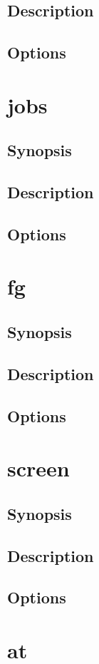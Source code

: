 \documentclass[a4paper, 10pt, onecolumn, openright, oneside]{book}
\begin{document}
			\subsection{Description}
			\subsection{Options}
		\section{jobs}
			\subsection{Synopsis}
			\subsection{Description}
			\subsection{Options}
		\section{fg}
			\subsection{Synopsis}
			\subsection{Description}
			\subsection{Options}
		\section{screen}
			\subsection{Synopsis}
			\subsection{Description}
			\subsection{Options}
		\section{at}
\end{document}
